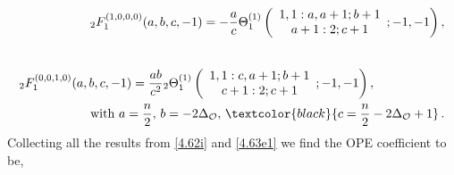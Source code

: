 \begin{align}
    \begin{split}    
 &{_2} F_1^{(1,0,0,0)}(a,b,c,-1)=-\frac{a}{c}\Theta_1^{(1)} \left( 
\begin{array}{c} 
1, 1 : a, a + 1; b + 1 \\
a + 1 : 2; c + 1 
\end{array} 
; -1, -1 \right), \\&   \nonumber 
\end{split} \\[0.5em]
\begin{split}
   &  {_2} F_1^{(0,0,1,0)}(a,b,c,-1)=\frac{ab}{c^2}{_2}\Theta_1^{(1)} \left( 
\begin{array}{c} 
1, 1 : c, a + 1; b + 1 \\
c + 1 : 2; c + 1 
\end{array} 
; -1, -1 \right), \\& \hspace{2 cm}\textrm{with}\,\,a=\frac{n}{2}, \,b=-2\Delta_{\mathcal{O}},\,\textcolor{black}{c=\frac{n}{2}-2\Delta_{\mathcal{O}}+1}\,. \label{4.63e}
\end{split}
\end{align}
Collecting all the results from \eqref{4.62i} and \eqref{4.63e1} we find the OPE coefficient to be,

